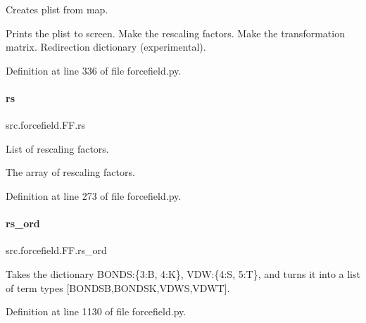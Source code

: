 Creates plist from map. 

Prints the plist to screen. Make the rescaling factors. Make the transformation matrix. Redirection dictionary (experimental). 

Definition at line 336 of file forcefield.\+py.

\mbox{\label{classsrc_1_1forcefield_1_1FF_a6ef3bc38784a4e68bc51bc06feb2e189}} 
\paragraph{\texorpdfstring{rs}{rs}}
{\footnotesize\ttfamily src.\+forcefield.\+F\+F.\+rs}



List of rescaling factors. 

The array of rescaling factors. 

Definition at line 273 of file forcefield.\+py.

\mbox{\label{classsrc_1_1forcefield_1_1FF_ae85c97bc7b6ebb1a6139f3fcde701ad9}} 
\paragraph{\texorpdfstring{rs\+\_\+ord}{rs\_ord}}
{\footnotesize\ttfamily src.\+forcefield.\+F\+F.\+rs\+\_\+ord}



Takes the dictionary \textquotesingle{}B\+O\+N\+DS\textquotesingle{}\+:\{3\+:\textquotesingle{}B\textquotesingle{}, 4\+:\textquotesingle{}K\textquotesingle{}\}, \textquotesingle{}V\+DW\textquotesingle{}\+:\{4\+:\textquotesingle{}S\textquotesingle{}, 5\+:\textquotesingle{}T\textquotesingle{}\}, and turns it into a list of term types \mbox{[}\textquotesingle{}B\+O\+N\+D\+SB\textquotesingle{},\textquotesingle{}B\+O\+N\+D\+SK\textquotesingle{},\textquotesingle{}V\+D\+WS\textquotesingle{},\textquotesingle{}V\+D\+WT\textquotesingle{}\mbox{]}. 



Definition at line 1130 of file forcefield.\+py.

\mbox{\label{classsrc_1_1forcefield_1_1FF_a91ce04e723c001379987020019c15725}} 
